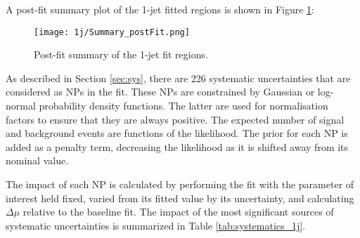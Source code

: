 A post-fit summary plot of the 1-jet fitted regions is shown in Figure \ref{fig:fit_results_1j}: 

\begin{figure}[H]
    \center
    \texttt{[image: 1j/Summary\_postFit.png]}
    \caption{Post-fit summary of the 1-jet fit regions.}
    \label{fig:fit_results_1j}
\end{figure}

As described in Section \ref{sec:sys}, there are 226 systematic uncertainties that are considered as NPs in the fit. These NPs are constrained by Gaussian or log-normal probability density functions. The latter are used for normalisation factors to ensure that they are always positive. The expected number of signal and background events are functions of the likelihood. The prior for each NP is added as a penalty term, decreasing the likelihood as it is shifted away from its nominal value. 

The impact of each NP is calculated by performing the fit with the parameter of interest held fixed, varied from its fitted value by its uncertainty, and calculating $\Delta\mu$ relative to the baseline fit.  The impact of the most significant sources of systematic uncertainties is summarized in Table \ref{tab:systematics_1j}. 

